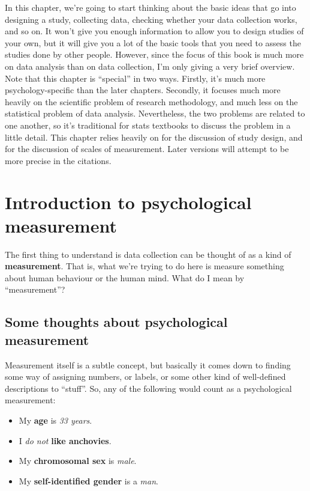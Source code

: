 \documentclass[
]{book}
\begin{document}
In this chapter, we're going to start thinking about the basic ideas that go into designing a study, collecting data, checking whether your data collection works, and so on. It won't give you enough information to allow you to design studies of your own, but it will give you a lot of the basic tools that you need to assess the studies done by other people. However, since the focus of this book is much more on data analysis than on data collection, I'm only giving a very brief overview. Note that this chapter is ``special'' in two ways. Firstly, it's much more psychology-specific than the later chapters. Secondly, it focuses much more heavily on the scientific problem of research methodology, and much less on the statistical problem of data analysis. Nevertheless, the two problems are related to one another, so it's traditional for stats textbooks to discuss the problem in a little detail. This chapter relies heavily on \citet{Campbell1963} for the discussion of study design, and \citet{Stevens1946} for the discussion of scales of measurement. Later versions will attempt to be more precise in the citations.

\section{Introduction to psychological measurement}\label{introduction-to-psychological-measurement}

The first thing to understand is data collection can be thought of as a kind of \textbf{measurement}. That is, what we're trying to do here is measure something about human behaviour or the human mind. What do I mean by ``measurement''?

\subsection{Some thoughts about psychological measurement}\label{some-thoughts-about-psychological-measurement}

Measurement itself is a subtle concept, but basically it comes down to finding some way of assigning numbers, or labels, or some other kind of well-defined descriptions to ``stuff''. So, any of the following would count as a psychological measurement:

\begin{itemize}
\item
  My {\textbf{age}} is {\emph{33 years}}.
\item
  I {\emph{do not}} {\textbf{like anchovies}}.
\item
  My {\textbf{chromosomal sex}} is {\emph{male}}.
\item
  My {\textbf{self-identified gender}} is a {\emph{man}}.
\end{itemize}
\end{document}
